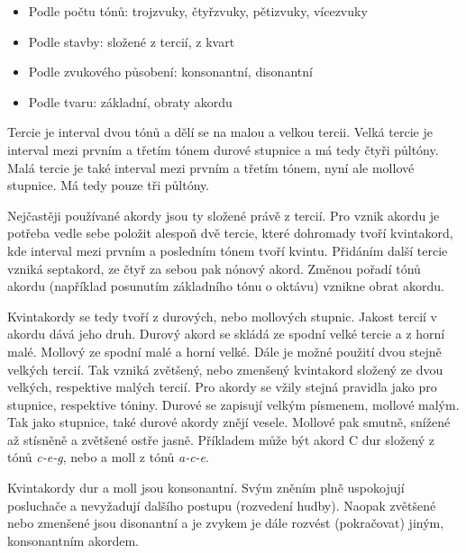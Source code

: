 \begin{itemize}
    \item Podle počtu tónů: trojzvuky, čtyřzvuky, pětizvuky, vícezvuky
    \item Podle stavby: složené z tercií, z kvart
    \item Podle zvukového působení: konsonantní, disonantní
    \item Podle tvaru: základní, obraty akordu
\end{itemize}

Tercie je interval dvou tónů a dělí se na malou a velkou tercii.
Velká tercie je interval mezi prvním a třetím tónem durové stupnice 
a má tedy čtyři půltóny.
Malá tercie je také interval mezi prvním a třetím tónem, nyní ale mollové stupnice.
Má tedy pouze tři půltóny.
\cite{zenkl}
\par

Nejčastěji používané akordy jsou ty složené právě z tercií.
Pro vznik akordu je potřeba vedle sebe položit alespoň dvě tercie,
které dohromady tvoří kvintakord, 
kde interval mezi prvním a posledním tónem tvoří kvintu.
Přidáním další tercie vzniká septakord, ze čtyř za sebou pak nónový akord.
Změnou pořadí tónů akordu (například posunutím základního tónu o oktávu) 
vznikne obrat akordu.
\cite{zenkl}
\par

Kvintakordy se tedy tvoří z durových, nebo mollových stupnic.
Jakost tercií v akordu dává jeho druh.
Durový akord se skládá ze spodní velké tercie a z horní malé.
Mollový ze spodní malé a horní velké.
Dále je možné použití dvou stejně velkých tercií.
Tak vzniká zvětšený, nebo zmenšený kvintakord 
složený ze dvou velkých, respektive malých tercií.
\cite{kofron}
Pro akordy se vžily stejná pravidla jako pro stupnice, respektive tóniny.
Durové se zapisují velkým písmenem, mollové malým.
Tak jako stupnice, také durové akordy znějí vesele.
Mollové pak smutně, snížené až stísněně a zvětšené ostře jasně.
\cite{cmiral}
Příkladem může být akord C dur složený z tónů \emph{c-e-g}, 
nebo a moll z tónů \emph{a-c-e}.
\par

Kvintakordy dur a moll jsou konsonantní.
Svým zněním plně uspokojují posluchače a nevyžadují dalšího postupu (rozvedení hudby).
Naopak zvětšené nebo zmenšené jsou disonantní 
a je zvykem je dále rozvést (pokračovat) jiným, konsonantním akordem.
\cite{cmiral}

